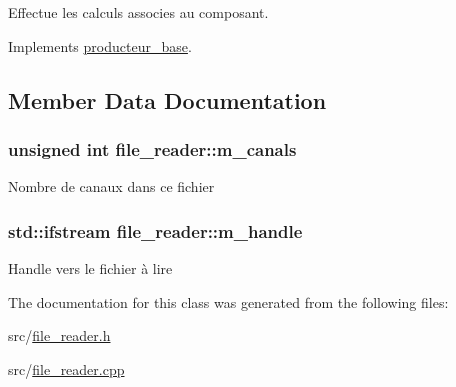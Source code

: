 Effectue les calculs associes au composant. 



Implements \hyperlink{classproducteur__base_af1e171c9e69b0998d5124c7389737f82}{producteur\-\_\-base}.



\subsection{Member Data Documentation}
\hypertarget{classfile__reader_a3dfaa67bb8ea591695eb1eecfdea4cde}{
\subsubsection[{m\-\_\-canals}]{\setlength{\rightskip}{0pt plus 5cm}unsigned int file\-\_\-reader\-::m\-\_\-canals\hspace{0.3cm}{\ttfamily [private]}}}\label{classfile__reader_a3dfaa67bb8ea591695eb1eecfdea4cde}
Nombre de canaux dans ce fichier \hypertarget{classfile__reader_aa7f6d7d6b00fe7e0524db94b2a279c8c}{
\subsubsection[{m\-\_\-handle}]{\setlength{\rightskip}{0pt plus 5cm}std\-::ifstream file\-\_\-reader\-::m\-\_\-handle\hspace{0.3cm}{\ttfamily [private]}}}\label{classfile__reader_aa7f6d7d6b00fe7e0524db94b2a279c8c}
Handle vers le fichier à lire 

The documentation for this class was generated from the following files\-:\begin{DoxyCompactItemize}
\item 
src/\hyperlink{file__reader_8h}{file\-\_\-reader.\-h}\item 
src/\hyperlink{file__reader_8cpp}{file\-\_\-reader.\-cpp}\end{DoxyCompactItemize}
